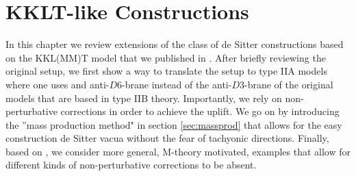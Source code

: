 \documentclass[a4paper,12pt,twoside,openright]{report}
\begin{document}
\chapter{KKLT-like Constructions} %
\label{sec:kkltconstr}
In this chapter we review extensions of the class of de Sitter constructions based on the KKL(MM)T model \cite{Kachru:2003aw,Kachru:2003sx} that we published in \cite{Cribiori:2019bfx,Cribiori:2019drf,Cribiori:2019hrb}. After briefly reviewing the original setup, we first show a way to translate the setup to type IIA models \cite{Cribiori:2019bfx} where one uses and anti-$D6$-brane instead of the anti-$D3$-brane of the original models that are based in type IIB theory. Importantly, we rely on non-perturbative corrections in order to achieve the uplift. We go on by introducing the ''mass production method" \cite{Cribiori:2019drf} in section \ref{sec:massprod} that allows for the easy construction de Sitter vacua without the fear of tachyonic directions. Finally, based on \cite{Cribiori:2019hrb}, we consider more general, M-theory motivated, examples that allow for different kinds of non-perturbative corrections to be absent.
\end{document}
